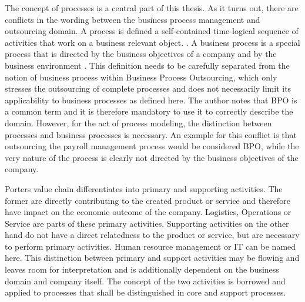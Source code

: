 	The concept of processes is a central part of this thesis. As it turns out, there are conflicts in the wording between the business process management and outsourcing domain. A process is defined a self-contained time-logical sequence of activities that work on a business relevant object. \citep[]{becker2012pm}. A business process is a special process that is directed by the business objectives of a company and by the business environment \citep[]{becker2012pm}. This definition needs to be carefully separated from the notion of business process within Business Process Outsourcing, which only stresses the outsourcing of complete processes and does not necessarily limit its applicability to business processes as defined here. The author notes that BPO is a common term and it is therefore mandatory to use it to correctly describe the domain. However, for the act of process modeling, the distinction between processes and business processes is necessary. An example for this conflict is that outsourcing the payroll management process would be considered BPO, while the very nature of the process is clearly not directed by the business objectives of the company. 
	
	Porters value chain differentiates into primary and supporting activities. The former are directly contributing to the created product or service and therefore have impact on the economic outcome of the company. Logistics, Operations or Service are parts of these primary activities. Supporting activities on the other hand do not have a direct relatedness to the product or service, but are necessary to perform primary activities. Human resource management or IT can be named here. This distinction between primary and support activities may be flowing and leaves room for interpretation and is additionally dependent on the business domain and company itself. The concept of the two activities is borrowed and applied to processes that shall be distinguished in core and support processes. 
	 

		
